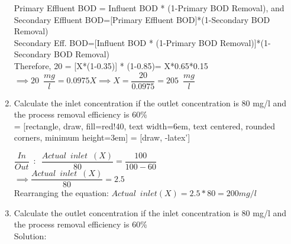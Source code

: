 \documentclass{article}
\begin{document}
\begin{enumerate}
Primary Effluent BOD = Influent BOD * (1-Primary BOD Removal), and\\
Secondary Effluent BOD=[Primary Effluent BOD]*(1-Secondary BOD Removal)\\
Secondary Eff. BOD=[Influent BOD * (1-Primary BOD Removal)]*(1-Secondary BOD Removal)\\

Therefore, 20 = [X*(1-0.35)] * (1-0.85)= X*0.65*0.15\\
$\implies 20 \enspace \dfrac{mg}{l}= 0.0975X \implies X=\dfrac{20}{0.0975}=\boxed{205 \enspace \dfrac{mg}{l}}$\\

\item Calculate the inlet concentration if the outlet concentration is 80 mg/l and the process removal efficiency is 60\%\\

 = [rectangle, draw, fill=red!40, 
    text width=6em, text centered, rounded corners, minimum height=3em]
 = [draw, -latex']
\begin{figure}[!h]
\centering
{}
\end{figure}

$\dfrac{In}{Out} \enspace : \enspace \dfrac{Actual \enspace inlet \enspace  (X)}{80}=\dfrac{100}{100-60}$\\
$\implies \dfrac{Actual \enspace inlet \enspace  (X)}{80}=2.5$\\    
Rearranging the equation:   $Actual \enspace inlet (X)=2.5*80 = \boxed{200 mg/l}$\\

\item Calculate the outlet concentration if the inlet concentration is 80 mg/l and the process removal efficiency is 60\%\\
Solution:\\


\end{enumerate}
\end{document}
